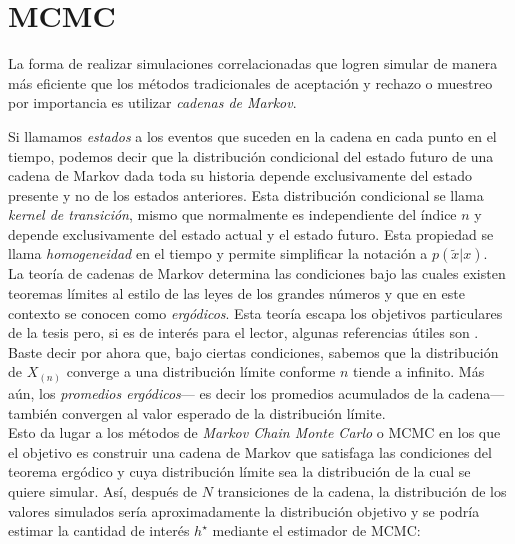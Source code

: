\section{MCMC}

La forma de realizar simulaciones correlacionadas que logren simular de manera más eficiente que los métodos tradicionales de aceptación y rechazo o muestreo por importancia es utilizar \textit{cadenas de Markov}.


Si llamamos \textit{estados} a los eventos que suceden en la cadena en cada punto en el tiempo, podemos decir que la distribución condicional del estado futuro de una cadena de Markov dada toda su historia depende exclusivamente del estado presente y no de los estados anteriores. Esta distribución condicional se llama \textit{kernel de transición}, mismo que normalmente es independiente del índice $n$ y depende exclusivamente del estado actual y el estado futuro. Esta propiedad se llama \textit{homogeneidad} en el tiempo y permite simplificar la notación a $p(\tilde{x}|x)$.\\ 

La teoría de cadenas de Markov determina las condiciones bajo las cuales existen teoremas límites al estilo de las leyes de los grandes números y que en este contexto se conocen como \textit{ergódicos}. Esta teoría escapa los objetivos particulares de la tesis pero, si es de interés para el lector, algunas referencias útiles son \textcites{Rincon12,Ross96,TaylorKarlin84}. Baste decir por ahora que, bajo ciertas condiciones, sabemos que la distribución de $X_{(n)}$ converge a una distribución límite conforme $n$ tiende a infinito. Más aún, los \textit{promedios ergódicos}--- es decir los promedios acumulados de la cadena--- también convergen al valor esperado de la distribución límite.\\ 

Esto da lugar a los métodos de \textit{Markov Chain Monte Carlo} o MCMC en los que el objetivo es construir una cadena de Markov que satisfaga las condiciones del teorema ergódico y cuya distribución límite sea la distribución de la cual se quiere simular. Así, después de $N$ transiciones de la cadena, la distribución de los valores simulados sería aproximadamente la distribución objetivo y se podría estimar la cantidad de interés $h^\star$ mediante el estimador de MCMC: 

